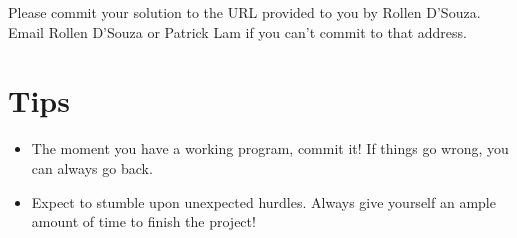 \documentclass{article}
\begin{document}
Please commit your solution to the URL provided to you by Rollen D'Souza. Email Rollen D'Souza or Patrick Lam if you can't commit to that address.

\section*{Tips}
\begin{itemize}
	\item The moment you have a working program, commit it! If things go wrong, you can always go back.
	\item Expect to stumble upon unexpected hurdles.  Always give yourself an ample amount of time to finish the project!	
\end{itemize}

\begin{flushleft}
\begin{thebibliography}{1}

\end{thebibliography}
\end{flushleft}
\end{document}
